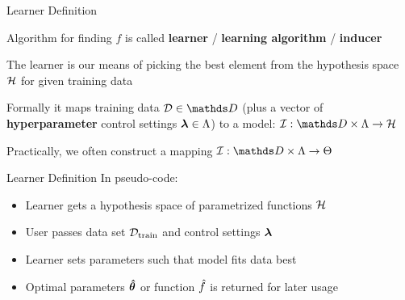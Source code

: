 \documentclass[11pt,compress,t,notes=noshow, xcolor=table]{beamer}
\begin{document}
\begin{framei}{Learner Definition}
\item Algorithm for finding  $f$ is called \textbf{learner} / \textbf{learning algorithm} /  \textbf{inducer}
\item The learner is our means of picking the best element from the hypothesis space $\mathcal{H}$ for given training data
\item Formally it maps training data $\D \in \allDatasets$ (plus a vector of \textbf{hyperparameter} control settings $\bm{\lambda} \in \Lambda$) to a model:
{
\vfill
$\ind: \preimageInducerShort \rightarrow \Hspace$
}
\item Practically, we often construct a mapping 
$\ind: \preimageInducerShort \rightarrow \Theta$
\end{framei}


\begin{frame2}{Learner Definition}
In pseudo-code:
\begin{itemize}
\item Learner gets a hypothesis space of parametrized functions $\mathcal{H}$
\item User passes data set $\mathcal{D}_{\text{train}}$ and control settings $\bm{\lambda}$
\item Learner sets parameters such that model fits data best
\item Optimal parameters $\bm{\hat\theta}$ or function $\hat{f}$ is returned for later usage
\end{itemize}
\end{frame2}

\endlecture
\end{document}
